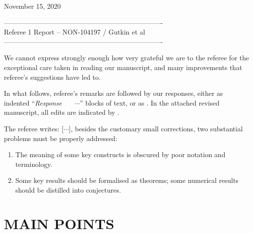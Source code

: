 \documentclass[12pt]{iopart}
\begin{document}
                    \hfill November 15, 2020

\bigskip
\noindent
---------------------------------------------------------------------- \\
Referee 1 Report -- NON-104197 / Gutkin et al \\
---------------------------------------------------------------------- \\

\bigskip
\bigskip



\noindent
We cannot express strongly enough how very grateful we are to the referee
for the exceptional care taken in reading our manuscript, and many
improvements that referee's suggestions have led to.

In what follows, referee's remarks are followed by our responses, either
as indented ``{\em Response~~~} $\cdots$'' blocks of text, or as
. In the attached revised manuscript, all edits
are indicated by .
\bigskip\bigskip

The referee writes:
[$\cdots$], besides the customary small corrections, two substantial
problems must be properly addressed:

\begin{enumerate}
  \item
The meaning of some key constructs is obscured by poor notation and terminology.
  \item
Some key results should be formalised as theorems; some numerical results should
be distilled into conjectures.
\end{enumerate}

\section*{MAIN POINTS}
\end{document}
